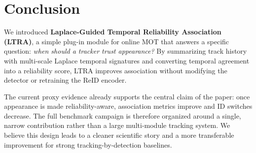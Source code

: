 \section{Conclusion}
We introduced \textbf{Laplace-Guided Temporal Reliability Association (LTRA)}, a simple plug-in module for online MOT that answers a specific question: \emph{when should a tracker trust appearance?} By summarizing track history with multi-scale Laplace temporal signatures and converting temporal agreement into a reliability score, LTRA improves association without modifying the detector or retraining the ReID encoder.

The current proxy evidence already supports the central claim of the paper: once appearance is made reliability-aware, association metrics improve and ID switches decrease. The full benchmark campaign is therefore organized around a single, narrow contribution rather than a large multi-module tracking system. We believe this design leads to a cleaner scientific story and a more transferable improvement for strong tracking-by-detection baselines.
